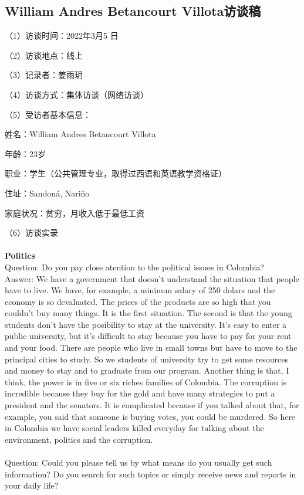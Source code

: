 \documentclass{phyasgn}\usepackage{nag}
\begin{document}
\subsection{William Andres Betancourt Villota访谈稿}
\par （1）访谈时间：2022年3月5 日 
\par （2）访谈地点：线上
\par （3）记录者：姜雨玥
\par （4）访谈方式：集体访谈（网络访谈）
\par （5）受访者基本信息：
  \par 姓名：William Andres Betancourt Villota
\par 年龄：23岁
\par 职业：学生（公共管理专业，取得过西语和英语教学资格证）
\par 住址：Sandoná, Nariño
\par 家庭状况：贫穷，月收入低于最低工资
\par （6）访谈实录\\\\
\textbf{Politics}\\
Question: Do you pay close atention to the political issues in Colombia?\\
Answer: We have a government that doesn’t understand the situation that people have to live. We have, for example, a minimun salary of 250 dolars and the economy is so devaluated. The prices of the products are so high that you couldn’t buy many things. It is the first situation. The second is that the young students don’t have the posibility to stay at the university. It’s easy to enter a public university, but it’s difficult to stay because you have to pay for your rent and your food. There are people who live in small towns but have to move to the principal cities to study. So we students of university try to get some resources and money to stay and to graduate from our program. Another thing is that, I think, the power is in five or six riches families of Colombia. The corruption is incredible because they buy for the gold and have many strategies to put a president and the senators. It is complicated because if you talked about that, for example, you said that someone is buying votes, you could be murdered. So here in Colombia we have social leaders killed everyday for talking about the environment, politics and the corruption. \\
\\
Question: Could you please tell us by what means do you usually get such information? Do you search for such topics or simply receive news and reports in your daily life?\\
\end{document}
